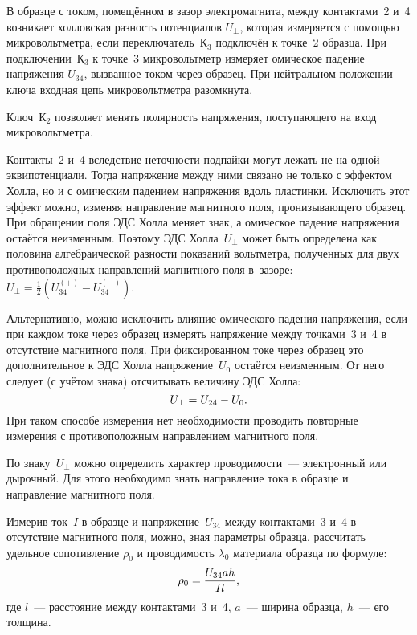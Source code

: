 В образце с током, помещённом в зазор электромагнита, между контактами~2 и~4
возникает холловская разность потенциалов $U_{\perp}$, которая измеряется с помощью
микровольтметра, если переключатель~К$_3$ подключён к точке~2 образца. При
подключении~К$_3$ к точке~3 микровольтметр измеряет омическое падение напряжения
$U_{34}$, вызванное током через образец. При нейтральном положении
ключа входная цепь микровольтметра разомкнута.

Ключ~К$_2$ позволяет менять полярность напряжения, поступающего на вход
микровольтметра.

Контакты~2 и~4 вследствие неточности подпайки могут лежать не на одной
эквипотенциали. Тогда напряжение между ними связано не только с эффектом
Холла, но и с омическим падением напряжения вдоль пластинки. 
Исключить этот эффект можно, изменяя направление магнитного поля, 
пронизывающего образец. 
При обращении поля ЭДС Холла меняет знак, а омическое падение напряжения
остаётся неизменным. Поэтому ЭДС Холла~$U_{\perp}$ может быть определена
как половина алгебраической разности показаний вольтметра, полученных для двух
противоположных направлений магнитного поля в~зазоре:
$U_{\perp} = \frac12 (U_{34}^{(+)}-U_{34}^{(-)})$.

Альтернативно, можно исключить влияние омического падения напряжения, 
если при каждом токе через образец измерять напряжение
между точками~3 и~4 в отсутствие магнитного поля. При фиксированном токе через
образец это дополнительное к ЭДС Холла напряжение~$U_0$ остаётся неизменным. 
От него следует (с учётом знака) отсчитывать величину ЭДС Холла:
\begin{equation}
U_{\perp} = U_{24} - U_0.
\eqmark{3.5.1}
\end{equation}
При таком способе измерения нет необходимости проводить повторные измерения
с противоположным направлением магнитного поля.

По знаку~$U_{\perp}$ можно определить характер проводимости~--- электронный или
дырочный. Для этого необходимо знать направление тока в образце и направление
магнитного поля.

Измерив ток~$I$ в образце и напряжение~$U_{34}$ между контактами~3 и~4 в
отсутствие магнитного поля, можно, зная параметры образца, рассчитать удельное
сопотивление $\rho_0$ и проводимость $\lambda_0$ материала образца по формуле:
\begin{equation}
	\rho_0=\frac{U_{34}ah}{Il},
	\eqmark{3.5.2}
\end{equation}
где $l$~--- расстояние между контактами~3 и~4, $a$~--- ширина образца, $h$~---
его толщина.

